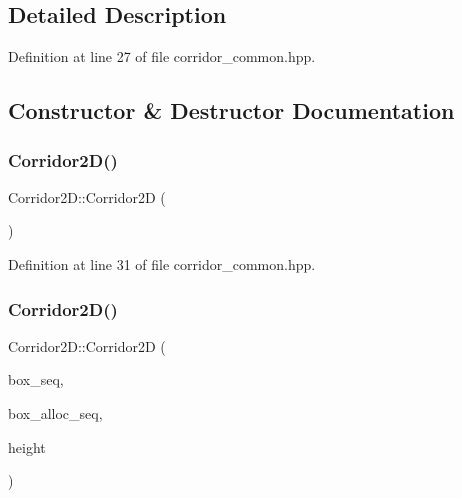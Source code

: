 \subsection{Detailed Description}


Definition at line 27 of file corridor\+\_\+common.\+hpp.



\subsection{Constructor \& Destructor Documentation}
\mbox{\label{struct_corridor2_d_a7c7b0f2c9075543a29b39fdaa54f55c9}} 
\subsubsection{\texorpdfstring{Corridor2\+D()}{Corridor2D()}\hspace{0.1cm}{\footnotesize\ttfamily [1/2]}}
{\footnotesize\ttfamily Corridor2\+D\+::\+Corridor2D (\begin{DoxyParamCaption}{ }\end{DoxyParamCaption})\hspace{0.3cm}{\ttfamily [inline]}}



Definition at line 31 of file corridor\+\_\+common.\+hpp.

\mbox{\label{struct_corridor2_d_ae6b45a137b041daaf8a2c14f407d3891}} 
\subsubsection{\texorpdfstring{Corridor2\+D()}{Corridor2D()}\hspace{0.1cm}{\footnotesize\ttfamily [2/2]}}
{\footnotesize\ttfamily Corridor2\+D\+::\+Corridor2D (\begin{DoxyParamCaption}\item[{\hyperlink{corridor__common_8hpp_a14a6c0d0a5d79585147d5bab3bbb030a}{Box\+Constraint\+Seq}}]{box\+\_\+seq,  }\item[{\hyperlink{corridor__common_8hpp_a631ecdcd7d0a6bd15a6625fccbba7909}{Box\+Alloc\+Seq}}]{box\+\_\+alloc\+\_\+seq,  }\item[{double}]{height }\end{DoxyParamCaption})\hspace{0.3cm}{\ttfamily [inline]}}



